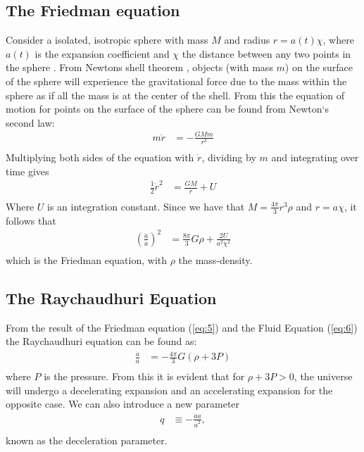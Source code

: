 \documentclass[a4paper, 11pt]{FSKH_623_Report}
\numberwithin{equation}{section}
\begin{document}
\subsection{The Friedman equation}
Consider a isolated, isotropic sphere with mass $M$ and radius $r=a(t)\chi$, where $a(t)$ is the expansion coefficient and $\chi$ the distance between any two points in the sphere \citep{notes4}. From Newtons shell theorem \citep{IronShell}, objects (with mass $m$) on the surface of the sphere will experience the gravitational force due to the mass within the sphere as if all the mass is at the center of the shell. From this the equation of motion for points on the surface of the sphere can be found from Newton`s second law:
\begin{equation}
\begin{split}
m\ddot{r} &= -\frac{GMm}{r^{2}}\\
\end{split}
\end{equation}
Multiplying both sides of the equation with $\dot{r}$, dividing by $m$ and integrating over time gives
\begin{equation}
\begin{split}
\frac{1}{2}\dot{r}^2 &= \frac{GM}{r}+U\\
\end{split}
\end{equation}
Where $U$ is an integration constant. Since we have that $M=\frac{4\pi}{3}r^{3}\rho$ and $r=a\chi$, it follows that
\begin{equation}\label{eq:5}
\begin{split}
\left(\frac{\dot{a}}{a}\right)^{2} &= \frac{8\pi}{3}G\rho+\frac{2U}{a^{2}\chi^{2}}\\
\end{split}
\end{equation}
which is the Friedman equation, with $\rho$ the mass-density.
\subsection{The Raychaudhuri Equation}
From the result of the Friedman equation (\ref{eq:5}) and the Fluid Equation (\ref{eq:6}) the Raychaudhuri equation can be found as:
\begin{equation}\label{eq:RayEq}
\begin{split}
\frac{\ddot{a}}{a} &= -\frac{4\pi}{3}G\left(\rho +3P\right)\\
\end{split}
\end{equation}
where $P$ is the pressure. From this it is evident that for $\rho +3P > 0$, the universe will undergo a decelerating expansion and an accelerating expansion for the opposite case. We can also introduce a new parameter
\begin{equation}\label{eq:Deceleration}
\begin{split}
q &\equiv -\frac{\ddot{a}a}{\dot{a}^{2}},     \\
\end{split}
\end{equation}
known as the deceleration parameter.
\end{document}
